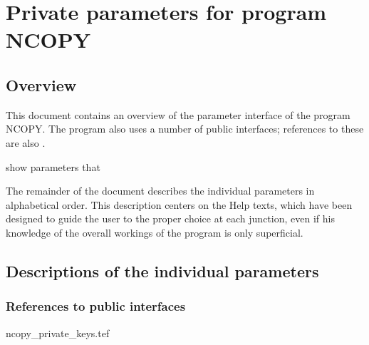 
\chapter{ Private parameters for program NCOPY}
\tableofcontents


\section{ Overview}

	This document contains an overview of the parameter interface of the
program NCOPY. The program also uses a number of public interfaces; references
to these are also .

show %
parameters that %


	The remainder of the document describes the individual parameters in
alphabetical order. This description centers on the Help texts, which have been
designed to guide the user to the proper choice at each junction, even if his
knowledge of the overall workings of the program is only superficial.


\section{ Descriptions of the individual parameters}
\label{.descriptions}

\subsection{ References to public interfaces}
\label{.public}

 {ncopy_private_keys.tef}
